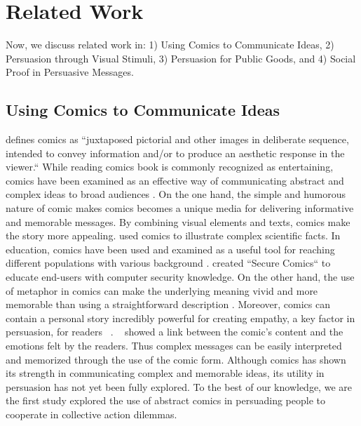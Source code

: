 \section{Related Work}
\label{sec:relatedwork}
Now, we discuss related work in: 1) Using Comics to Communicate Ideas, 2) Persuasion through Visual Stimuli, 3) Persuasion for Public Goods, and 4) Social Proof in Persuasive Messages.

\subsection{Using Comics to Communicate Ideas}
\textcite{scott1993understanding} defines comics as ``juxtaposed pictorial and other images in deliberate sequence, intended to convey information and/or to produce an aesthetic response in the viewer.`` While reading comics book is commonly recognized as entertaining, comics have been examined as an effective way of communicating abstract and complex ideas to broad audiences \cite{McDermottPB18,cary2004going,scott1993understanding, Zhang-Kennedy:2017:SCI:3206217.3206282}. On the one hand, the simple and humorous nature of comic makes comics becomes a unique media for delivering informative and memorable messages. By combining visual elements and texts, comics make the story more appealing. \textcite{McDermottPB18} used comics to illustrate complex scientific facts. In education, comics have been used and examined as a useful tool for reaching different populations with various background \cite{McDermottPB18,cary2004going,scott1993understanding}. \textcite{Zhang-Kennedy:2017:SCI:3206217.3206282} created ``Secure Comics`` to educate end-users with computer security knowledge. On the other hand, the use of metaphor in comics can make the underlying meaning vivid and more memorable than using a straightforward description \cite{McDermottPB18,scott1993understanding}. Moreover, comics can contain a personal story incredibly powerful for creating empathy, a key factor in persuasion, for readers ~\cite{weaver2017losing}. ~\textcite{matsubara2016emotional} showed a link between the comic's content and the emotions felt by the readers. Thus complex messages can be easily interpreted and memorized through the use of the comic form. Although comics has shown its strength in communicating complex and memorable ideas, its utility in persuasion has not yet been fully explored. To the best of our knowledge, we are the first study explored the use of abstract comics in persuading people to cooperate in collective action dilemmas.  

